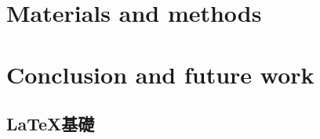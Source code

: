 \documentclass[12pt, a4paper, oneside]{book}
\begin{document}
\begin{spacing}{1.5}
		\chapter{Materials and methods}
		\label{chap:Materials}
		

		\chapter{Conclusion and future work}
		\label{chap:Conclusion}
		
		
		\begin{singlespace}
		\clearpage
		\renewcommand{\bibname}{References}
		
		\clearpage
		\end{singlespace}
		\begin{appendices}
			\chapter{\LaTeX 基礎}
			\label{app:A}
			
		\end{appendices}
		\backmatter
	\end{spacing}
\end{document}

